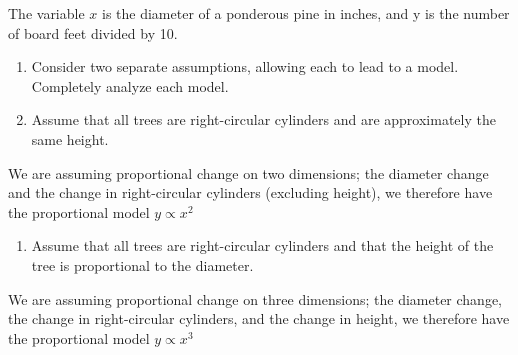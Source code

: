 \documentclass[]{article}
\newenvironment{Shaded}{\begin{snugshade}}{\end{snugshade}}
\newcommand{\KeywordTok}[1]{\textcolor[rgb]{0.13,0.29,0.53}{\textbf{{#1}}}}
\newcommand{\DataTypeTok}[1]{\textcolor[rgb]{0.13,0.29,0.53}{{#1}}}
\newcommand{\DecValTok}[1]{\textcolor[rgb]{0.00,0.00,0.81}{{#1}}}
\newcommand{\StringTok}[1]{\textcolor[rgb]{0.31,0.60,0.02}{{#1}}}
\newcommand{\NormalTok}[1]{{#1}}
\providecommand{\tightlist}{%
  \setlength{\itemsep}{0pt}\setlength{\parskip}{0pt}}
\begin{document}
The variable \(x\) is the diameter of a ponderous pine in inches, and y
is the number of board feet divided by 10.

\begin{enumerate}
\def\labelenumi{\alph{enumi}.}
\item
  Consider two separate assumptions, allowing each to lead to a model.
  Completely analyze each model.
\item
  Assume that all trees are right-circular cylinders and are
  approximately the same height.
\end{enumerate}

We are assuming proportional change on two dimensions; the diameter
change and the change in right-circular cylinders (excluding height), we
therefore have the proportional model \(y \propto x^2\)

\begin{Shaded}
\end{Shaded}

\begin{enumerate}
\def\labelenumi{\roman{enumi}.}
\setcounter{enumi}{1}
\tightlist
\item
  Assume that all trees are right-circular cylinders and that the height
  of the tree is proportional to the diameter.
\end{enumerate}

We are assuming proportional change on three dimensions; the diameter
change, the change in right-circular cylinders, and the change in
height, we therefore have the proportional model \(y \propto x^3\)
\end{document}
